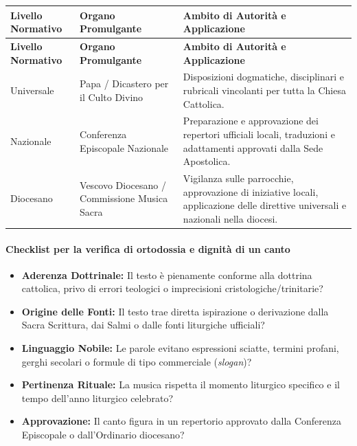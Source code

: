 \documentclass[12pt,a4paper]{article}
\begin{document}
	\begin{longtable}{L{3cm}L{4cm}L{7cm}}
		\toprule
		\textbf{Livello Normativo} & \textbf{Organo Promulgante} & \textbf{Ambito di Autorità e Applicazione} \\
		\midrule
		\endfirsthead
		\toprule
		\textbf{Livello Normativo} & \textbf{Organo Promulgante} & \textbf{Ambito di Autorità e Applicazione} \\
		\midrule
		\endhead
		\bottomrule
		\endlastfoot
		Universale & Papa / Dicastero per il Culto Divino & Disposizioni dogmatiche, disciplinari e rubricali vincolanti per tutta la Chiesa Cattolica. \\
		Nazionale & Conferenza Episcopale Nazionale & Preparazione e approvazione dei repertori ufficiali locali, traduzioni e adattamenti approvati dalla Sede Apostolica. \\
		Diocesano & Vescovo Diocesano / Commissione Musica Sacra & Vigilanza sulle parrocchie, approvazione di iniziative locali, applicazione delle direttive universali e nazionali nella diocesi. \\
	\end{longtable}
	
	\paragraph{Checklist per la verifica di ortodossia e dignità di un canto}\label{checklist-per-la-verifica-di-ortodossia-e-dignita-di-un-canto}
	
	\begin{itemize}[leftmargin=*,label=$\square$]
		\item \textbf{Aderenza Dottrinale:} Il testo è pienamente conforme alla dottrina cattolica, privo di errori teologici o imprecisioni cristologiche/trinitarie?
		\item \textbf{Origine delle Fonti:} Il testo trae diretta ispirazione o derivazione dalla Sacra Scrittura, dai Salmi o dalle fonti liturgiche ufficiali?
		\item \textbf{Linguaggio Nobile:} Le parole evitano espressioni sciatte, termini profani, gerghi secolari o formule di tipo commerciale (\emph{slogan})?
		\item \textbf{Pertinenza Rituale:} La musica rispetta il momento liturgico specifico e il tempo dell'anno liturgico celebrato?
		\item \textbf{Approvazione:} Il canto figura in un repertorio approvato dalla Conferenza Episcopale o dall'Ordinario diocesano?
	\end{itemize}
	
\end{document}
